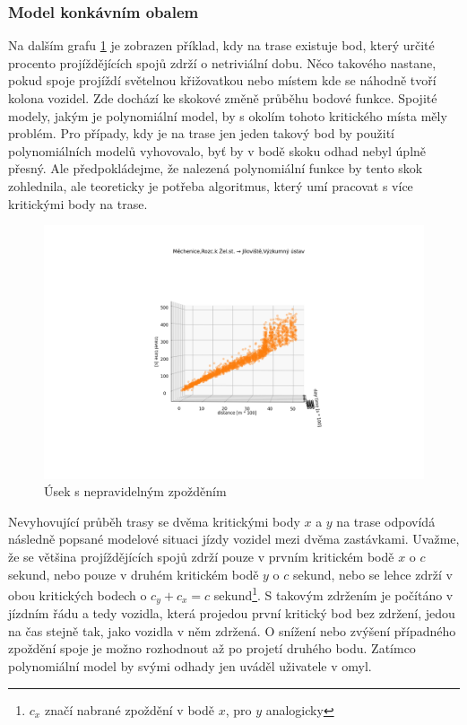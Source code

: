 \subsubsection{Model konkávním obalem}


Na dalším grafu \ref{fig:nepredvidatelne_zdrzeni} je zobrazen příklad, kdy na trase existuje bod, který určité procento projíždějících spojů zdrží o netriviální dobu. Něco takového nastane, pokud spoje projíždí světelnou křižovatkou nebo místem kde se náhodně tvoří kolona vozidel. Zde dochází ke skokové změně průběhu bodové funkce. Spojité modely, jakým je polynomiální model, by s okolím tohoto kritického místa měly problém. Pro případy, kdy je na trase jen jeden takový bod by použití polynomiálních modelů vyhovovalo, byť by v bodě skoku odhad nebyl úplně přesný. Ale předpokládejme, že nalezená polynomiální funkce by tento skok zohlednila, ale teoreticky je potřeba algoritmus, který umí pracovat s více kritickými body na trase.


\begin{figure}
\centering
  \includegraphics[width=\linewidth]{../img/nepredvidatelne_zdrzeni.png}
  \caption{Úsek s nepravidelným zpožděním}
  \label{fig:nepredvidatelne_zdrzeni}
\end{figure}


\bigbreak


Nevyhovující průběh trasy se dvěma kritickými body $x$ a $y$ na trase odpovídá následně popsané modelové situaci jízdy vozidel mezi dvěma zastávkami. Uvažme, že se většina projíždějících spojů zdrží pouze v prvním kritickém bodě $x$ o $c$ sekund, nebo pouze v druhém kritickém bodě $y$ o $c$ sekund, nebo se lehce zdrží v obou kritických bodech o $c_y + c_x = c$ sekund\footnote{$c_x$ značí nabrané zpoždění v bodě $x$, pro $y$ analogicky}. S takovým zdržením je počítáno v jízdním řádu a tedy vozidla, která projedou první kritický bod bez zdržení, jedou na čas stejně tak, jako vozidla v něm zdržená. O snížení nebo zvýšení případného zpoždění spoje je možno rozhodnout až po projetí druhého bodu. Zatímco polynomiální model by svými odhady jen uváděl uživatele v omyl.


